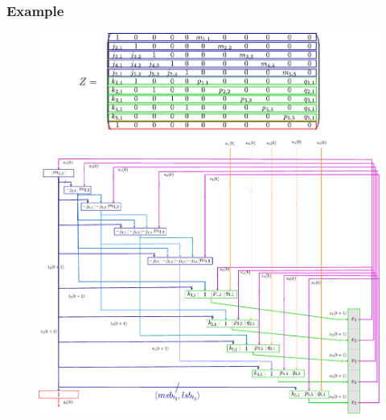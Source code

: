 \begin{frame}
	\frametitle{Example}
	\begin{figure}
		\includegraphics[scale=0.4]{pictures/exampleFull.pdf}
	\end{figure}
\end{frame}

